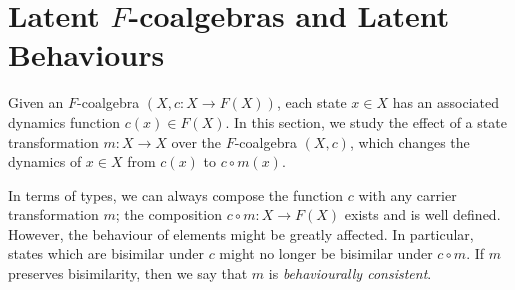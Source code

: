  
\section{Latent $F$-coalgebras and Latent Behaviours}
Given an $F$-coalgebra $(X,c\colon X\rightarrow F(X))$, each state $x\in X$ has an associated dynamics function $c(x)\in F(X)$. In this section, we study the effect of a state transformation $m\colon X\rightarrow X$ over the $F$-coalgebra $(X,c)$, which changes the dynamics of $x\in X$ from $c(x)$ to $c\circ m(x)$. 

In terms of types, we can always compose the function $c$ with any carrier transformation $m$; the composition $c \circ m\colon X\rightarrow F(X)$ exists and is well defined. However, the behaviour of elements might be greatly affected. In particular, states which are bisimilar under $c$ might no longer be bisimilar under $c \circ m$. If $m$ preserves bisimilarity, then we say that $m$ is \emph{behaviourally consistent}.

